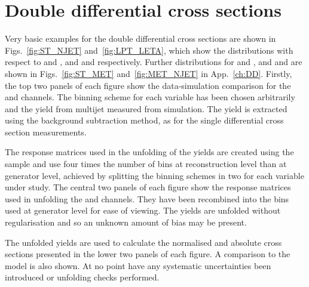 \section{Double differential cross sections} %
\label{sec:double_differential_cross_sections}

Very basic examples for the double differential cross sections are shown in Figs.~\ref{fig:ST_NJET} and~\ref{fig:LPT_LETA}, which show the distributions with respect to \ST{} and \NJET{}, and \LPT{} and \LETA{} respectively.
Further distributions for \ST{} and \ptmiss{}, and \ptmiss{} and \NJET{} are shown in Figs.~\ref{fig:ST_MET} and~\ref{fig:MET_NJET} in App.~\ref{ch:DD}.
Firstly, the top two panels of each figure show the data-simulation comparison for the \eJets{} and \muJets{} channels.
The binning scheme for each variable has been chosen arbitrarily and the yield from multijet \QCD{} measured from simulation.
The \ttbar{} yield is extracted using the background subtraction method, as for the single differential cross section measurements.

The response matrices used in the unfolding of the \ttbar{} yields are created using the \powhegpythia{} sample and use four times the number of bins at reconstruction level than at generator level, achieved by splitting the binning schemes in two for each variable under study.
The central two panels of each figure show the response matrices used in unfolding the \eJets{} and \muJets{} channels.
They have been recombined into the bins used at generator level for ease of viewing.
The \ttbar{} yields are unfolded without regularisation and so an unknown amount of bias may be present.

The unfolded \ttbar{} yields are used to calculate the normalised and absolute cross sections presented in the lower two panels of each figure.
A comparison to the \powhegpythia{} \ttbar{} model is also shown.
At no point have any systematic uncertainties been introduced or unfolding checks performed.

